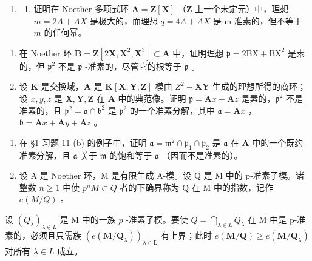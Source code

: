 
\begin{enumerate}
\def\labelenumi{\arabic{enumi}.}
\tightlist
\item
  \begin{enumerate}
  \def\labelenumii{(\alph{enumii})}
  \tightlist
  \item
    证明在 Noether 多项式环 \(\mathbf{A} = \mathbf{Z}[\mathbf{X}]\) （\(\mathbf{Z}\) 上一个未定元）中，理想 \(m = 2A + AX\) 是极大的，而理想 \(q = 4A + AX\) 是 m-准素的，但不等于 \(m\) 的任何幂。
  \end{enumerate}
\end{enumerate}

\begin{enumerate}
\def\labelenumi{(\alph{enumi})}
\setcounter{enumi}{1}
\item
  在 Noether 环 \(\mathbf{B} = \mathbf{Z}[2\mathbf{X},\mathbf{X}^2,\mathbf{X}^3] \subset \mathbf{A}\) 中，证明理想 \(\mathfrak{p} = 2\mathrm{BX} + \mathrm{BX}^2\) 是素的，但 \(\mathfrak{p}^2\) 不是 \(\mathfrak{p}\) -准素的，尽管它的根等于 \(\mathfrak{p}\) 。
\item
  设 \(\mathbf{K}\) 是交换域，\(\mathbf{A}\) 是 \(\mathbf{K}[\mathbf{X},\mathbf{Y},\mathbf{Z}]\) 模由 \(Z^2 -\mathbf{XY}\) 生成的理想所得的商环；设 \(x,y,z\) 是 \(\mathbf{X},\mathbf{Y},\mathbf{Z}\) 在 \(\mathbf{A}\) 中的典范像。证明 \(\mathfrak{p} = \mathbf{A}x + \mathbf{A}z\) 是素的，\(\mathfrak{p}^2\) 不是准素的，且 \(\mathfrak{p}^2 = \mathfrak{a}\cap \mathfrak{b}^2\) 是 \(\mathfrak{p}^2\) 的一个准素分解，其中 \(\mathfrak{a} = \mathbf{A}x\) ，\(\mathfrak{b} = \mathbf{A}x + \mathbf{A}y + \mathbf{A}z\) 。
\end{enumerate}

\begin{enumerate}
\def\labelenumi{\arabic{enumi}.}
\setcounter{enumi}{1}
\item
  在 §1 习题 11 (b) 的例子中，证明 \(\mathfrak{a} = \mathfrak{m}^2 \cap \mathfrak{p}_1 \cap \mathfrak{p}_2\) 是 \(\mathfrak{a}\) 在 \(\mathbf{A}\) 中的一个既约准素分解，且 \(\mathfrak{a}\) 关于 \(\mathfrak{m}\) 的饱和等于 \(\mathfrak{a}\) （因而不是准素的）。
\item
  设 A 是 Noether 环，M 是有限生成 A-模。设 Q 是 M 中的 p-准素子模。诸整数 \(n \geqslant 1\) 中使 \(p^{n}M \subset Q\) 者的下确界称为 Q 在 M 中的指数，记作 \(e(M/Q)\) 。
\end{enumerate}

设 \((Q_{\lambda})_{\lambda \in L}\) 是 M 中的一族 \(p\) -准素子模。要使 \(Q = \bigcap_{\lambda \in L} Q_{\lambda}\) 在 M 中是 p-准素的，必须且只需族 \((e(\mathbf{M}/\mathbf{Q}_{\lambda}))_{\lambda\in\mathbf{L}}\) 有上界；此时 \(e(\mathbf{M}/\mathbf{Q})\geqslant e(\mathbf{M}/\mathbf{Q}_{\lambda})\) 对所有 \(\lambda\in L\) 成立。

